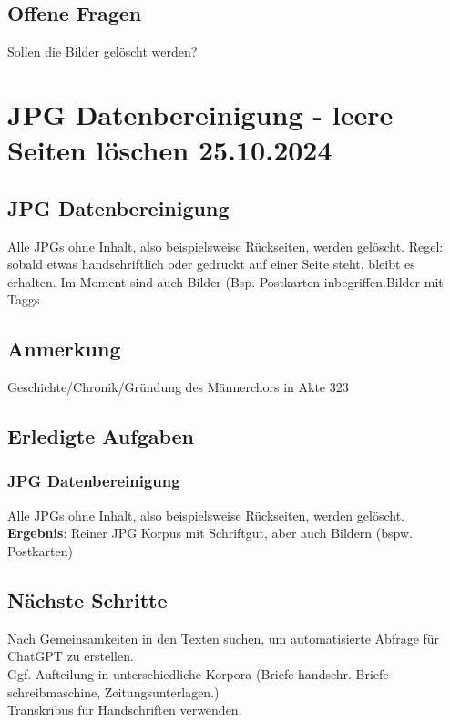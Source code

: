 \documentclass{article}
\begin{document}
\subsection*{Offene Fragen}
 Sollen die Bilder gelöscht werden?\\



\noindent\hrulefill
\section{JPG Datenbereinigung - leere Seiten löschen \small 25.10.2024 } %

\subsection*{JPG Datenbereinigung}
Alle JPGs ohne Inhalt, also beispielsweise Rückseiten, werden gelöscht. Regel: sobald etwas handschriftlich oder gedruckt auf einer Seite steht, bleibt es erhalten. Im Moment sind auch Bilder (Bsp. Postkarten inbegriffen.Bilder mit Taggs 
\subsection{Anmerkung}
Geschichte/Chronik/Gründung des Männerchors in Akte 323

\subsection*{Erledigte Aufgaben}
\subsubsection*{\small JPG Datenbereinigung }
Alle JPGs ohne Inhalt, also beispielsweise Rückseiten, werden gelöscht.\\
\textbf{Ergebnis}: Reiner JPG Korpus mit Schriftgut, aber auch Bildern (bspw. Postkarten)

\subsection*{Nächste Schritte}
 Nach Gemeinsamkeiten in den Texten suchen, um automatisierte Abfrage für ChatGPT zu erstellen. \\ 
Ggf. Aufteilung in unterschiedliche Korpora (Briefe handschr. Briefe schreibmaschine, Zeitungsunterlagen.)\\
 Transkribus für Handschriften verwenden.
\end{document}

